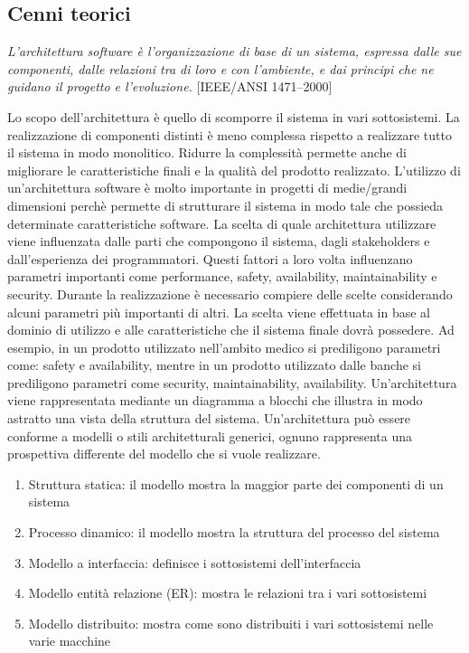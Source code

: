 \documentclass[12pt]{report}
\begin{document}
\subsection{Cenni teorici}
\begin{center}
	\textit{L’architettura software è l’organizzazione di base di un sistema, espressa dalle
	sue componenti, dalle relazioni tra di loro e con l’ambiente, e dai principi che ne
	guidano il progetto e l’evoluzione.} [IEEE/ANSI 1471–2000]\cite{architettura}
\end{center}
Lo scopo dell'architettura è quello di scomporre il sistema in vari sottosistemi. La realizzazione di componenti distinti è meno complessa rispetto a realizzare tutto il sistema in modo monolitico. Ridurre la complessità permette anche di migliorare le caratteristiche finali e la qualità del prodotto realizzato. L'utilizzo di un'architettura software è molto importante in progetti di medie/grandi dimensioni perchè permette di strutturare il sistema in modo tale che possieda determinate caratteristiche software. La scelta di quale architettura utilizzare viene influenzata dalle parti che compongono il sistema, dagli stakeholders e dall'esperienza dei programmatori. Questi fattori a loro volta influenzano parametri importanti come performance, safety, availability, maintainability e security. Durante la realizzazione è necessario compiere delle scelte considerando alcuni parametri più importanti di altri. La scelta viene effettuata in base al dominio di utilizzo e alle caratteristiche che il sistema finale dovrà possedere. Ad esempio, in un prodotto utilizzato nell'ambito medico si prediligono parametri come: safety e availability, mentre in un prodotto utilizzato dalle banche si prediligono parametri come security, maintainability, availability.
Un'architettura viene rappresentata mediante un diagramma a blocchi che illustra in modo astratto una vista della struttura del sistema. Un'architettura può essere conforme a modelli o stili architetturali generici, ognuno rappresenta una prospettiva differente del modello che si vuole realizzare.
\begin{enumerate}
	\item Struttura statica: il modello mostra la maggior parte dei componenti di un sistema
	\item Processo dinamico: il modello mostra la struttura del processo del sistema
	\item Modello a interfaccia: definisce i sottosistemi dell’interfaccia
	\item Modello entità relazione (ER): mostra le relazioni tra i vari sottosistemi
	\item Modello distribuito: mostra come sono distribuiti i vari sottosistemi nelle varie macchine
\end{enumerate}
\end{document}
